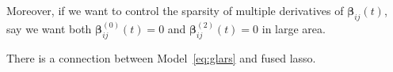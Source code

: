 \documentclass[11pt]{article}
\newcommand{\bbeta}{{\boldsymbol{\beta}}}
\begin{document}
Moreover, if we want to control the sparsity of multiple derivatives of $\bbeta_{ij}(t)$, say we want both $\bbeta_{ij}^{(0)}(t) = 0$ and $\bbeta_{ij}^{(2)}(t) = 0$ in large area.

There is a connection between Model~\ref{eq:glars} and fused lasso.



\end{document}
